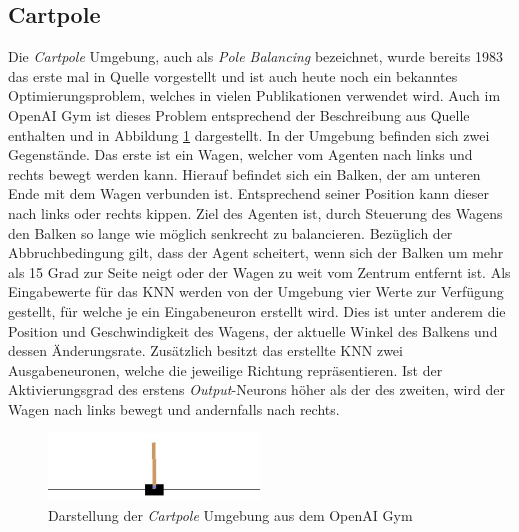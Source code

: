\subsection{Cartpole}
Die \emph{Cartpole} Umgebung, auch als \emph{Pole Balancing} bezeichnet, wurde bereits 1983 das erste mal in Quelle \cite{barto1983neuronlike} vorgestellt und ist auch heute noch ein bekanntes Optimierungsproblem, welches in vielen Publikationen verwendet wird. Auch im OpenAI Gym ist dieses Problem entsprechend der Beschreibung aus Quelle \cite{barto1983neuronlike} enthalten und in Abbildung \ref{fig:cartpole_environment} dargestellt. In der Umgebung befinden sich zwei Gegenstände. Das erste ist ein Wagen, welcher vom Agenten nach links und rechts bewegt werden kann. Hierauf befindet sich ein Balken, der am unteren Ende mit dem Wagen verbunden ist. Entsprechend seiner Position kann dieser nach links oder rechts kippen. Ziel des Agenten ist, durch Steuerung des Wagens den Balken so lange wie möglich senkrecht zu balancieren. Bezüglich der Abbruchbedingung gilt, dass der Agent scheitert, wenn  sich der Balken um mehr als 15 Grad zur Seite neigt oder der Wagen zu weit vom Zentrum entfernt ist. Als Eingabewerte für das \ac{KNN} werden von der Umgebung vier Werte zur Verfügung gestellt, für welche je ein Eingabeneuron erstellt wird. Dies ist unter anderem die Position und Geschwindigkeit des Wagens, der aktuelle Winkel des Balkens und dessen Änderungsrate. Zusätzlich besitzt das erstellte \ac{KNN} zwei Ausgabeneuronen, welche die jeweilige Richtung repräsentieren. Ist der Aktivierungsgrad des erstens \emph{Output}-Neurons höher als der des zweiten, wird der Wagen nach links bewegt und andernfalls nach rechts.
\begin{figure}[!h]
	\centering
	\includegraphics[width=0.5\textwidth]{./img/cartpole_env.JPG} 
	\caption{Darstellung der \emph{Cartpole} Umgebung aus dem OpenAI Gym}
	\label{fig:cartpole_environment}
\end{figure} 
